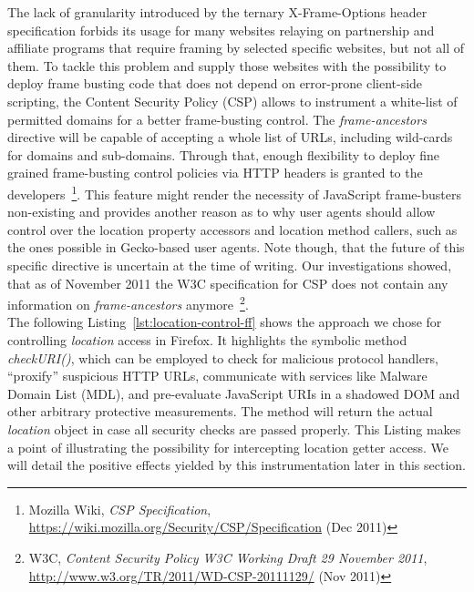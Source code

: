     The lack of granularity introduced by the ternary X-Frame-Options header specification forbids its usage for many websites relaying on partnership and affiliate programs that require framing by selected specific websites, but not all of them. To tackle this problem and supply those websites with the possibility to deploy frame busting code that does not depend on error-prone client-side scripting, the Content Security Policy (CSP) allows to instrument a white-list of permitted domains for a better frame-busting control. The \textit{frame-ancestors} directive will be capable of accepting a whole list of URLs, including wild-cards for domains and sub-domains. Through that,  enough flexibility to deploy fine grained frame-busting control policies via HTTP headers is granted to the developers~\footnote{Mozilla Wiki, \textit{CSP Specification}, \url{https://wiki.mozilla.org/Security/CSP/Specification} (Dec 2011)}. This feature might render the necessity of JavaScript frame-busters non-existing and provides another reason as to why user agents should allow control over the location property accessors and location method callers, such as the ones possible in Gecko-based user agents. Note though, that the future of this specific directive is uncertain at the time of writing. Our investigations showed, that as of November 2011 the W3C specification for CSP does not contain any information on \textit{frame-ancestors} anymore~\footnote{W3C, \textit{Content Security Policy W3C Working Draft 29 November 2011}, \url{http://www.w3.org/TR/2011/WD-CSP-20111129/} (Nov 2011)}.\\

    The following Listing~\ref{lst:location-control-ff} shows the approach we chose for controlling \textit{location} access in Firefox. It highlights the symbolic method \textit{checkURI()}, which can be employed to check for malicious protocol handlers, ``proxify'' suspicious HTTP URLs, communicate with services like Malware Domain List (MDL), and pre-evaluate JavaScript URIs in a shadowed DOM and other arbitrary protective measurements. The method will return the actual \textit{location} object in case all security checks are passed properly. This Listing makes a point of illustrating the possibility for intercepting location getter access. We will detail the positive effects yielded by this instrumentation later in this section.

